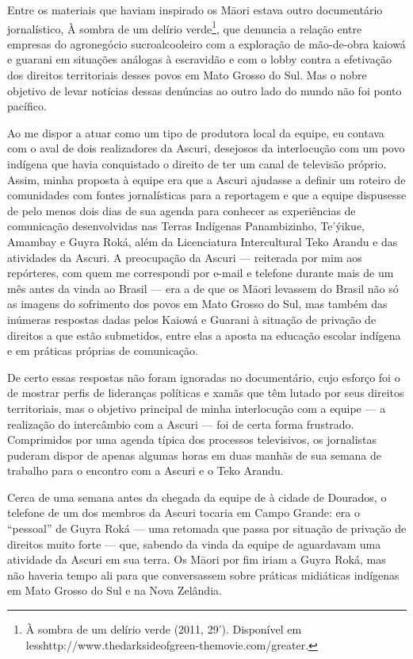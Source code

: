Entre os materiais que haviam inspirado os M\=aori estava outro
documentário jornalístico, À sombra de um delírio verde\footnote{À
sombra de um delírio verde (2011, 29’). Disponível em
{less}http://www.thedarksideofgreen-themovie.com/{greater}.},
que denuncia a relação entre empresas do agronegócio sucroalcooleiro
com a exploração de mão-de-obra kaiowá e guarani em situações análogas
à escravidão e com o lobby contra a efetivação dos direitos
territoriais desses povos em Mato Grosso do Sul. Mas o nobre objetivo
de levar notícias dessas denúncias ao outro lado do mundo não foi ponto
pacífico.

Ao me dispor a atuar como um tipo de produtora local da equipe, eu
contava com o aval de dois realizadores da Ascuri, desejosos da
interlocução com um povo indígena que havia conquistado o direito de
ter um canal de televisão próprio. Assim, minha proposta à equipe era
que a Ascuri ajudasse a definir um roteiro de comunidades com fontes
jornalísticas para a reportagem e que a equipe dispusesse de pelo menos
dois dias de sua agenda para conhecer as experiências de comunicação
desenvolvidas nas Terras Indígenas Panambizinho, Te’ýikue, Amambay e
Guyra Roká, além da Licenciatura Intercultural Teko Arandu e das
atividades da Ascuri. A preocupação da Ascuri — reiterada por mim aos
repórteres, com quem me correspondi por e-mail e telefone durante mais
de um mês antes da vinda ao Brasil — era a de que os M\=aori levassem
do Brasil não só as imagens do sofrimento dos povos em Mato Grosso do
Sul, mas também das inúmeras respostas dadas pelos Kaiowá e Guarani à
situação de privação de direitos a que estão submetidos, entre elas a
aposta na educação escolar indígena e em práticas próprias de
comunicação. 

De certo essas respostas não foram ignoradas no documentário, cujo
esforço foi o de mostrar perfis de lideranças políticas e xamãs que têm
lutado por seus direitos territoriais, mas o objetivo principal de
minha interlocução com a equipe — a realização do intercâmbio com a
Ascuri — foi de certa forma frustrado. Comprimidos por uma agenda
típica dos processos televisivos, os jornalistas puderam dispor de
apenas algumas horas em duas manhãs de sua semana de trabalho para o
encontro com a Ascuri e o Teko Arandu.

Cerca de uma semana antes da chegada da equipe de  à cidade de
Dourados, o telefone de um dos membros da Ascuri tocaria em Campo
Grande: era o ``pessoal'' de Guyra Roká — uma retomada que passa por
situação de privação de direitos muito forte — que, sabendo da vinda da
equipe de  aguardavam uma atividade da Ascuri em sua terra. Os
M\=aori por fim iriam a Guyra Roká, mas não haveria tempo ali para que
conversassem sobre práticas midiáticas indígenas em Mato Grosso do Sul
e na Nova Zelândia. 

